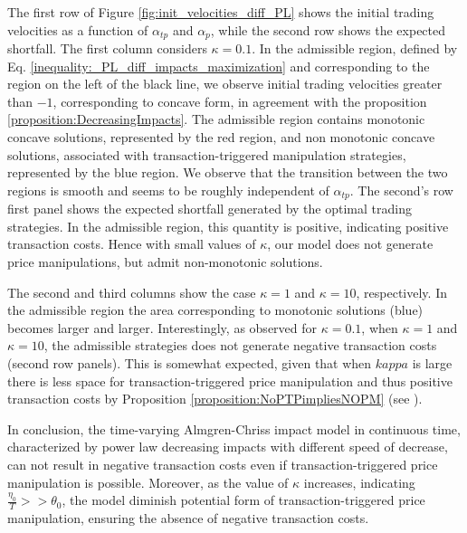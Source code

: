 \documentclass[final,3p,authoryear,12pt]{elsarticle}
\begin{document}
\begin{itemize}
The first row of Figure \ref{fig:init_velocities_diff_PL} shows the initial trading velocities as a function of $\alpha_{tp}$ and $\alpha_{p}$, while the second row shows the expected shortfall. The first column considers $\kappa=0.1$. In the admissible region, defined by Eq. \ref{inequality:_PL_diff_impacts_maximization} and corresponding to the region on the left of the black line, we observe initial trading velocities greater than $-1$, corresponding to concave form, in agreement with the proposition \ref{proposition:DecreasingImpacts}. The admissible region contains monotonic concave solutions, represented by the  red region, and non monotonic concave solutions, associated with transaction-triggered manipulation strategies, represented by the blue region. We observe that the transition between the two regions is smooth and seems to be roughly independent of $\alpha_{tp}$. 
The second's row first panel shows the expected shortfall generated by the optimal trading strategies. In the admissible region, this quantity is positive, indicating positive transaction costs. Hence with small values of $\kappa$, our model does not generate price manipulations, but admit non-monotonic solutions. 

The second and third columns show the case $\kappa=1$ and $\kappa=10$, respectively. In the admissible region the  area corresponding to monotonic solutions (blue) becomes larger and larger. 
Interestingly, as observed for $\kappa=0.1$, when $\kappa=1$ and $\kappa=10$, the admissible strategies does not generate negative transaction costs (second row panels). This is somewhat expected, given that when $kappa$ is large there is less space for transaction-triggered price manipulation and thus 
positive transaction costs by Proposition \ref{proposition:NoPTPimpliesNOPM} (see \cite{alfonsi2010optimal}).

In conclusion, the time-varying Almgren-Chriss impact model in continuous time, characterized by power law decreasing impacts with different speed of decrease, can not result in negative transaction costs even if transaction-triggered price manipulation is possible. Moreover, as the value of $\kappa$ increases, indicating $\frac{\eta_{0}}{T}>>\theta_{0}$, the model diminish potential form of transaction-triggered price manipulation, ensuring the absence of negative transaction costs.



\end{itemize}
\end{document}
